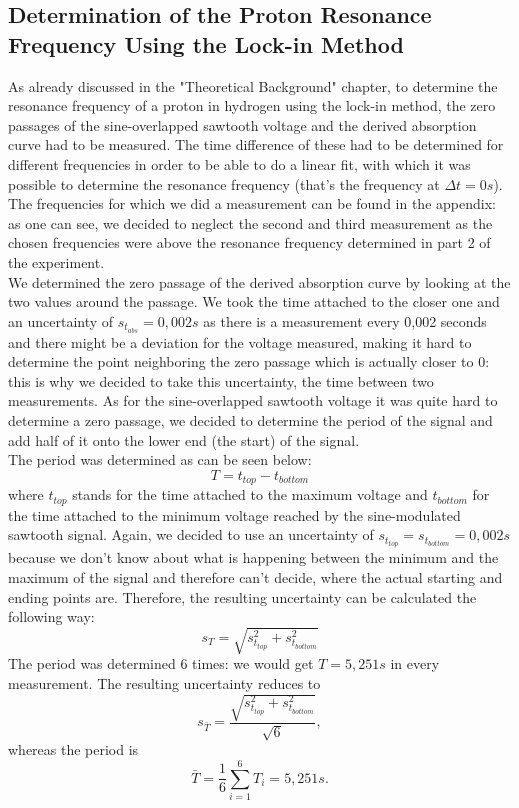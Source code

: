 \subsection{Determination of the Proton Resonance Frequency Using the Lock-in Method}
As already discussed in the "Theoretical Background" chapter, to determine the resonance frequency of a proton in hydrogen using the lock-in method, the zero passages of the sine-overlapped sawtooth voltage and the derived absorption curve had to be measured. The time difference of these had to be determined for different frequencies in order to be able to do a linear fit, with which it was possible to determine the resonance frequency (that's the frequency at $\Delta t=0s$). The frequencies for which we did a measurement can be found in the appendix: as one can see, we decided to neglect the second and third measurement as the chosen frequencies were above the resonance frequency determined in part 2 of the experiment. \\
We determined the zero passage of the derived absorption curve by looking at the two values around the passage. We took the time attached to the closer one and an uncertainty of $s_{t_{abs}}=0,002 s$ as there is a measurement every 0,002 seconds and there might be a deviation for the voltage measured, making it hard to determine the point neighboring the zero passage which is actually closer to 0: this is why we decided to take this uncertainty, the time between two measurements. As for the sine-overlapped sawtooth voltage it was quite hard to determine a zero passage, we decided to determine the period of the signal and add half of it onto the lower end (the start)  of the signal. \\
The period was determined as can be seen below:\\
\[T=t_{top}-t_{bottom}\] where $t_{top}$ stands for the time attached to the maximum voltage and $t_{bottom}$ for the time attached to the minimum voltage reached by the sine-modulated sawtooth signal. Again, we decided to use an uncertainty of $s_{t_ {top}}=s_{t_{bottom}}=0,002 s$ because we don't know about what is happening between the minimum and the maximum of the signal and therefore can't decide, where the actual starting and ending points are. Therefore, the resulting uncertainty can be calculated the following way:\\
\[s_{T}=\sqrt{s_{t_{top}}^{2}+s_{t_{bottom}}^{2}}\]
The period was determined 6 times: we would get $T=5,251 s$ in every measurement. The resulting uncertainty reduces to \[s_{\bar{T}}=\frac{\sqrt{s_{t_{top}}^{2}+s_{t_{bottom}}^{2}}}{\sqrt{6}},\] whereas the period is \[\bar{T}=\frac{1}{6}\sum\limits_{i=1}^{6}T_{i}=5,251 s.\]
